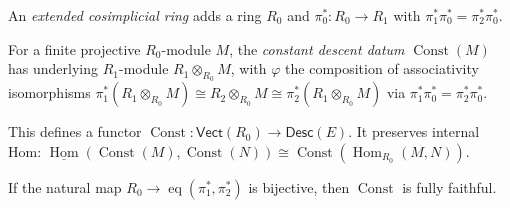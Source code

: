 \begin{definition}
  \label{def:extended_cosimplicial_ring}
  \leanok
  An \emph{extended cosimplicial ring} adds a ring $R_0$ and
  $\pi_0^\ast \colon R_0 \to R_1$ with
  $\pi_1^\ast\pi_0^\ast = \pi_2^\ast\pi_0^\ast$.
\end{definition}

\begin{definition}
  \label{def:constant_descent_datum}
  \leanok
  For a finite projective $R_0$-module $M$, the \emph{constant descent datum}
  $\operatorname{Const}(M)$ has underlying $R_1$-module $R_1 \otimes_{R_0} M$,
  with $\varphi$ the composition of associativity isomorphisms
  $\pi_1^\ast(R_1 \otimes_{R_0} M) \cong R_2 \otimes_{R_0} M
   \cong \pi_2^\ast(R_1 \otimes_{R_0} M)$
  via $\pi_1^\ast\pi_0^\ast = \pi_2^\ast\pi_0^\ast$.
\end{definition}

\begin{definition}
  \label{def:constant_descent_functor}
  \leanok
  This defines a functor
  $\operatorname{Const} \colon \mathsf{Vect}(R_0) \to \mathsf{Desc}(E)$.
  It preserves internal Hom:
  $\underline{\operatorname{Hom}}(\operatorname{Const}(M), \operatorname{Const}(N))
   \cong \operatorname{Const}(\operatorname{Hom}_{R_0}(M, N))$.
\end{definition}

\begin{theorem}
  \label{thm:constant_descent_fully_faithful}
  \leanok
  If the natural map $R_0 \to \operatorname{eq}(\pi_1^\ast, \pi_2^\ast)$ is bijective,
  then $\operatorname{Const}$ is fully faithful.
\end{theorem}

